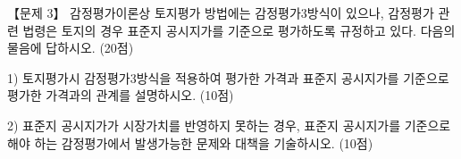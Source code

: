 \begin{longquestion}{【문제 3】}
감정평가이론상 토지평가 방법에는 감정평가3방식이 있으나, 감정평가 관련 법령은 토지의 경우 표준지 공시지가를 기준으로 평가하도록 규정하고 있다. 다음의 물음에 답하시오. (20점) \par
1) 토지평가시 감정평가3방식을 적용하여 평가한 가격과 표준지 공시지가를 기준으로 평가한 가격과의 관계를 설명하시오. (10점) \par
2) 표준지 공시지가가 시장가치를 반영하지 못하는 경우, 표준지 공시지가를 기준으로 해야 하는 감정평가에서 발생가능한 문제와 대책을 기술하시오. (10점) \par
\end{longquestion}

